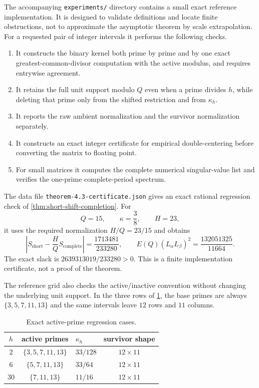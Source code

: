\documentclass[11pt]{article}
\theoremstyle{definition}
\theoremstyle{remark}
\begin{document}
The accompanying \texttt{experiments/} directory contains a small exact reference implementation.  It is designed to validate definitions and locate finite obstructions, not to approximate the asymptotic theorem by scale extrapolation.  For a requested pair of integer intervals it performs the following checks.
\begin{enumerate}[label=(\roman*),leftmargin=2.5em]
 \item It constructs the binary kernel both prime by prime and by one exact greatest-common-divisor computation with the active modulus, and requires entrywise agreement.
 \item It retains the full unit support modulo $Q$ even when a prime divides $h$, while deleting that prime only from the shifted restriction and from $\kappa_h$.
 \item It reports the raw ambient normalization and the survivor normalization separately.
 \item It constructs an exact integer certificate for empirical double-centering before converting the matrix to floating point.
 \item For small matrices it computes the complete numerical singular-value list and verifies the one-prime complete-period spectrum.
\end{enumerate}

The data file \texttt{theorem-4.3-certificate.json} gives an exact rational regression check of \cref{thm:short-shift-completion}.  For
\[
 Q=15,
 \qquad \kappa=\frac38,
 \qquad H=23,
\]
it uses the required normalization $H/Q=23/15$ and obtains
\[
 \left|S_{\mathrm{short}}-\frac{H}{Q}S_{\mathrm{complete}}\right|
 =\frac{1713481}{233280},
 \qquad
 E(Q)(L_\alpha L_\beta)^2
 =\frac{132051325}{11664}.
\]
The exact slack is $2639313019/233280>0$.  This is a finite implementation certificate, not a proof of the theorem.

The reference grid also checks the active/inactive convention without changing the underlying unit support.  In the three rows of \cref{tab:active-prime-regression}, the base primes are always $\{3,5,7,11,13\}$ and the same intervals leave $12$ rows and $11$ columns.
\begin{table}[t]
\centering
\caption{Exact active-prime regression cases.}
\label{tab:active-prime-regression}
\begin{tabular}{cclc}
\toprule
$h$ & active primes & $\kappa_h$ & survivor shape \\
\midrule
$2$  & $\{3,5,7,11,13\}$ & $33/128$ & $12\times11$ \\
$6$  & $\{5,7,11,13\}$   & $33/64$  & $12\times11$ \\
$30$ & $\{7,11,13\}$     & $11/16$  & $12\times11$ \\
\bottomrule
\end{tabular}
\end{table}
\end{document}
